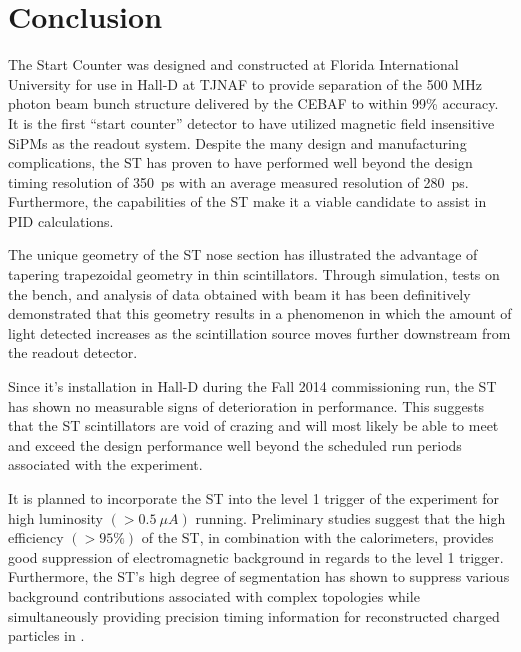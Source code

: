 \section{Conclusion} \label{sec:conclusion}

The \gx{} Start Counter was designed and constructed at Florida International University for use in Hall-D at TJNAF to provide separation of the 500 MHz photon beam bunch structure delivered by the CEBAF to within 99\% accuracy.  It is the first ``start counter'' detector to have utilized magnetic field insensitive SiPMs as the readout system.  Despite the many design and manufacturing complications, the ST has proven to have performed well beyond the design timing resolution of 350~ps with an average measured resolution of 280~ps.  Furthermore, the capabilities of the ST make it a viable candidate to assist in PID calculations.

The unique geometry of the ST nose section has illustrated the advantage of tapering trapezoidal geometry in thin scintillators.  Through simulation, tests on the bench, and analysis of data obtained with beam it has been definitively demonstrated that this geometry results in a phenomenon in which the amount of light detected increases as the scintillation source moves further downstream from the readout detector.

Since it's installation in Hall-D during the Fall 2014 commissioning run, the ST has shown no measurable signs of deterioration in performance.  This suggests that the ST scintillators are void of crazing and will most likely be able to meet and exceed the design performance well beyond the scheduled run periods associated with the \gx{} experiment.

It is planned to incorporate the ST into the level 1 trigger of the \gx{} experiment for high luminosity $(> 0.5\ \mu A)$ running.  Preliminary studies suggest that the high efficiency $(> 95\%)$ of the ST, in combination with the calorimeters, provides good suppression of electromagnetic background in regards to the level 1 trigger.  Furthermore, the ST's high degree of segmentation has shown to suppress various background contributions associated with complex topologies while simultaneously providing precision timing information for reconstructed charged particles in \gx{}.

%